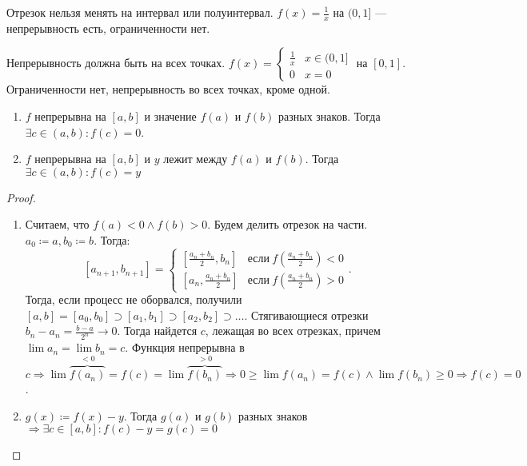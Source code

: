 \begin{remark}
    Отрезок нельзя менять на интервал или полуинтервал. $f(x) = \frac{1}{x}$ на $(0, 1]$ --- непрерывность есть, ограниченности нет.
\end{remark}
\begin{remark}
    Непрерывность должна быть на всех точках. $f(x) = \begin{cases} \frac{1}{x} & x \in (0, 1] \\ 0 & x = 0\end{cases}$ на $[0, 1]$. Ограниченности нет, непрерывность во всех точках, кроме одной. 
\end{remark}
\begin{theorem}
    \slashn
    \begin{enumerate}
        \item $f$ непрерывна на  $[a, b]$ и значение  $f(a)$ и  $f(b)$ разных знаков. Тогда  $\exists c \in (a, b)\!: f(c) = 0$.
        \item $f$ непрерывна на  $[a, b]$ и  $y$ лежит между  $f(a)$ и $f(b)$. Тогда  $\exists c \in (a, b)\!: f(c) = y$ 
    \end{enumerate}
\end{theorem}
\begin{proof}
    \slashn
    \begin{enumerate}
        \item Считаем, что $f(a) < 0 \land f(b) > 0$. Будем делить отрезок на части. $a_0 \coloneqq a, b_0 \coloneqq b$. Тогда: \[
        [a_{n+1}, b_{n+1}] = \begin{cases} 
            [\frac{a_n+b_n}{2}, b_n] & \text{если}\ f(\frac{a_n + b_n}{2}) < 0 \\
            [a_n, \frac{a_n+b_n}{2}] & \text{если}\ f(\frac{a_n + b_n}{2}) > 0
        \end{cases}
    .\] 
    Тогда, если процесс не оборвался, получили $[a, b] = [a_0,b_0] \supset [a_1, b_1] \supset [a_2, b_2] \supset \ldots$. Стягивающиеся отрезки $b_n - a_n = \frac{b-a}{2^n} \to 0$. Тогда найдется $c$, лежащая во всех отрезках, причем  $\lim a_n = \lim b_n = c$. Функция непрерывна в  $c \Rightarrow \lim \overbrace{f(a_n)}^{<0} = f(c) = \lim \overbrace{f(b_n)}^{>0} \Rightarrow 0 \ge \lim f(a_n) = f(c) \land \lim f(b_n) \ge 0 \Rightarrow f(c) = 0$.
\item $g(x) \coloneqq f(x) - y$. Тогда $g(a)$ и $g(b)$ разных знаков  $\Rightarrow \exists c \in [a, b]\!:f(c) - y = g(c) = 0$
        \end{enumerate}
\end{proof}

